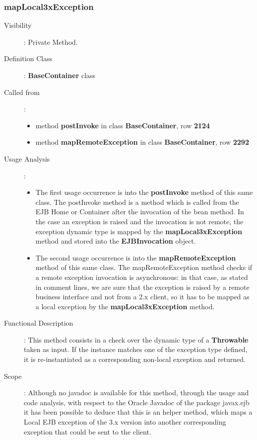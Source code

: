 \documentclass[11pt, a4paper,titlepage]{article}
\begin{document}
	 \subsubsection{mapLocal3xException}
	 \begin{description}
	 	\item[Visibility]: Private Method.
	 	\item[Definition Class]: \textbf{BaseContainer} class
	 	\item[Called from]: 
		 	\begin{itemize}
		 		\item method \textbf{postInvoke} in class \textbf{BaseContainer}, row \textbf{2124}
		 		\item method \textbf{mapRemoteException} in class \textbf{BaseContainer}, row \textbf{2292}
		 	\end{itemize}
	 	\item[Usage Analysis]: 
	 	\begin{itemize}
			\item The first usage occurrence is into the \textbf{postInvoke} method of this same class. The postInvoke method is a method which is called from the EJB Home or Container after the invocation of the bean method. In the case an exception is raised and the invocation is not remote, the exception dynamic type is mapped by the \textbf{mapLocal3xException} method and stored into the \textbf{EJBInvocation} object.
			\item The second usage occurrence is into the \textbf{mapRemoteException} method of this same class. The mapRemoteException method checks if a remote exception invocation is asynchronous: in that case, as stated in comment lines, we are sure that the exception is raised by a remote business interface and not from a 2.x client, so it has to be mapped as a local exception by the \textbf{mapLocal3xException} method.
	 	\end{itemize} 
	 	\item[Functional Description]: This method consists in a check over the dynamic type of a \textbf{Throwable} taken as input. If the instance matches one of the exception type defined, it is re-instantiated as a corresponding non-local exception and returned.
	 	
	 	\item[Scope]: Although no javadoc is available for this method, through the usage and code analysis, with respect to the Oracle Javadoc of the package javax.ejb it has been possible to deduce that this is an helper method, which maps a Local EJB exception of the 3.x version into another corresponding exception that could be sent to the client.
	 \end{description}
	
\end{document}
